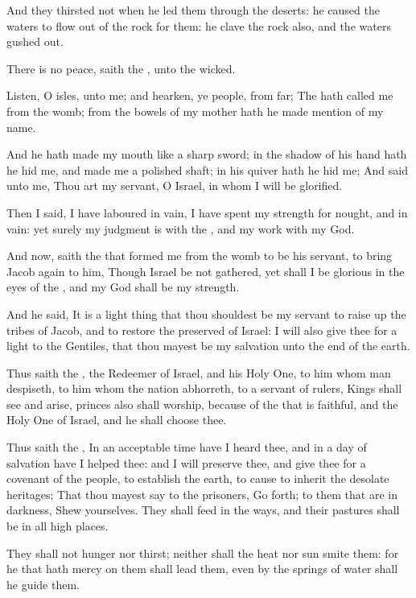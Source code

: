 \Verse And they thirsted not when he led them through the deserts: he caused the waters to flow out of the rock for them: he clave the rock also, and the waters gushed out.

\Verse There is no peace, saith the \LORD, unto the wicked.


\Chapter
\Verse Listen, O isles, unto me; and hearken, ye people, from far; The \LORD hath called me from the womb; from the bowels of my mother hath he made mention of my name.

\Verse And he hath made my mouth like a sharp sword; in the shadow of his hand hath he hid me, and made me a polished shaft; in his quiver hath he hid me; \Verse And said unto me, Thou art my servant, O Israel, in whom I will be glorified.

\Verse Then I said, I have laboured in vain, I have spent my strength for nought, and in vain: yet surely my judgment is with the \LORD, and my work with my God.

\Verse And now, saith the \LORD that formed me from the womb to be his servant, to bring Jacob again to him, Though Israel be not gathered, yet shall I be glorious in the eyes of the \LORD, and my God shall be my strength.

\Verse And he said, It is a light thing that thou shouldest be my servant to raise up the tribes of Jacob, and to restore the preserved of Israel: I will also give thee for a light to the Gentiles, that thou mayest be my salvation unto the end of the earth.

\Verse Thus saith the \LORD, the Redeemer of Israel, and his Holy One, to him whom man despiseth, to him whom the nation abhorreth, to a servant of rulers, Kings shall see and arise, princes also shall worship, because of the \LORD that is faithful, and the Holy One of Israel, and he shall choose thee.

\Verse Thus saith the \LORD, In an acceptable time have I heard thee, and in a day of salvation have I helped thee: and I will preserve thee, and give thee for a covenant of the people, to establish the earth, to cause to inherit the desolate heritages; \Verse That thou mayest say to the prisoners, Go forth; to them that are in darkness, Shew yourselves. They shall feed in the ways, and their pastures shall be in all high places.

\Verse They shall not hunger nor thirst; neither shall the heat nor sun smite them: for he that hath mercy on them shall lead them, even by the springs of water shall he guide them.

